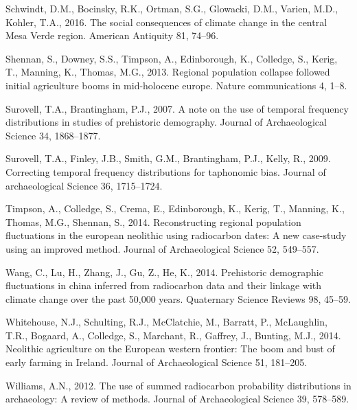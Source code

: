 \documentclass[
]{sa}
\newlength{\cslhangindent}
\newenvironment{cslreferences}%
  {\setlength{\parindent}{0pt}%
  \everypar{\setlength{\hangindent}{\cslhangindent}}\ignorespaces}%
  {\par}
\begin{document}
\begin{cslreferences}
\leavevmode\hypertarget{ref-Schwindt2016}{}%
Schwindt, D.M., Bocinsky, R.K., Ortman, S.G., Glowacki, D.M., Varien, M.D., Kohler, T.A., 2016. The social consequences of climate change in the central Mesa Verde region. American Antiquity 81, 74--96.

\leavevmode\hypertarget{ref-Shennan2013}{}%
Shennan, S., Downey, S.S., Timpson, A., Edinborough, K., Colledge, S., Kerig, T., Manning, K., Thomas, M.G., 2013. Regional population collapse followed initial agriculture booms in mid-holocene europe. Nature communications 4, 1--8.

\leavevmode\hypertarget{ref-Surovell2007}{}%
Surovell, T.A., Brantingham, P.J., 2007. A note on the use of temporal frequency distributions in studies of prehistoric demography. Journal of Archaeological Science 34, 1868--1877.

\leavevmode\hypertarget{ref-Surovell2009}{}%
Surovell, T.A., Finley, J.B., Smith, G.M., Brantingham, P.J., Kelly, R., 2009. Correcting temporal frequency distributions for taphonomic bias. Journal of archaeological Science 36, 1715--1724.

\leavevmode\hypertarget{ref-Timpson2014}{}%
Timpson, A., Colledge, S., Crema, E., Edinborough, K., Kerig, T., Manning, K., Thomas, M.G., Shennan, S., 2014. Reconstructing regional population fluctuations in the european neolithic using radiocarbon dates: A new case-study using an improved method. Journal of Archaeological Science 52, 549--557.

\leavevmode\hypertarget{ref-Wang2014}{}%
Wang, C., Lu, H., Zhang, J., Gu, Z., He, K., 2014. Prehistoric demographic fluctuations in china inferred from radiocarbon data and their linkage with climate change over the past 50,000 years. Quaternary Science Reviews 98, 45--59.

\leavevmode\hypertarget{ref-Whitehouse2014}{}%
Whitehouse, N.J., Schulting, R.J., McClatchie, M., Barratt, P., McLaughlin, T.R., Bogaard, A., Colledge, S., Marchant, R., Gaffrey, J., Bunting, M.J., 2014. Neolithic agriculture on the European western frontier: The boom and bust of early farming in Ireland. Journal of Archaeological Science 51, 181--205.

\leavevmode\hypertarget{ref-Williams2012}{}%
Williams, A.N., 2012. The use of summed radiocarbon probability distributions in archaeology: A review of methods. Journal of Archaeological Science 39, 578--589.
\end{cslreferences}

\newpage
\end{document}
